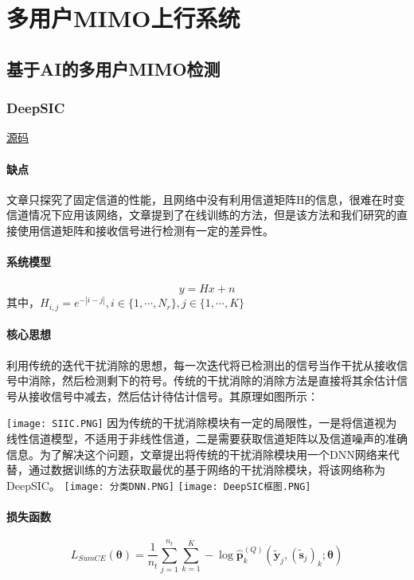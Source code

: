 \section{多用户MIMO上行系统}
\subsection{基于AI的多用户MIMO检测}
\subsubsection{DeepSIC\cite{2020DeepSIC}}
\href{https://github.com/nirshlezinger1/DeepSIC}{源码} \par 
\paragraph{缺点}
文章只探究了固定信道的性能，且网络中没有利用信道矩阵H的信息，很难在时变信道情况下应用该网络，文章提到了在线训练的方法，但是该方法和我们研究的直接使用信道矩阵和接收信号进行检测有一定的差异性。
\paragraph{系统模型}
\begin{equation}
    y=Hx+n
\end{equation}
其中，$H_{i,j}=e^{-|i-j|},i\in \{1,\cdots,N_r\}, j\in \{1,\cdots, K\}$
\paragraph{核心思想}\par 
利用传统的迭代干扰消除的思想，每一次迭代将已检测出的信号当作干扰从接收信号中消除，然后检测剩下的符号。传统的干扰消除的消除方法是直接将其余估计信号从接收信号中减去，然后估计待估计信号。其原理如图所示： \par 
\texttt{[image: SIIC.PNG]}
因为传统的干扰消除模块有一定的局限性，一是将信道视为线性信道模型，不适用于非线性信道，二是需要获取信道矩阵以及信道噪声的准确信息。为了解决这个问题，文章提出将传统的干扰消除模块用一个DNN网络来代替，通过数据训练的方法获取最优的基于网络的干扰消除模块，将该网络称为DeepSIC。
\texttt{[image: 分类DNN.PNG]}
\texttt{[image: DeepSIC框图.PNG]}
\paragraph{损失函数}
\begin{equation}
    L_{SumCE}(\bm{\theta})=\frac{1}{n_t}\sum_{j=1}^{n_t}\sum_{k=1}^{K}-\log \hat{\bm{p}}_k^{(Q)}(\tilde{\bm{y}}_j,(\tilde{\bm{s}}_j)_k;\bm{\theta})
\end{equation}
